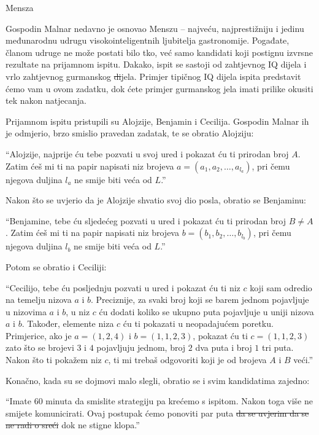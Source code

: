 \begin{statement}[
  problempoints=100,
  timelimit=5 sekundi,
  memorylimit=512 MiB,
]{Mensza}

Gospodin Malnar nedavno je osnovao Menszu -- najveću, najprestižniju i jedinu
međunarodnu udrugu visokointeligentnih ljubitelja gastronomije. Pogađate, članom
udruge ne može postati bilo tko, već samo kandidati koji postignu izvrsne
rezultate na prijamnom ispitu. Dakako, ispit se sastoji od zahtjevnog IQ dijela
i vrlo zahtjevnog gurmanskog \sout{di}jela. Primjer tipičnog IQ dijela ispita
predstavit ćemo vam u ovom zadatku, dok ćete primjer gurmanskog jela imati
prilike okusiti tek nakon natjecanja.

Prijamnom ispitu pristupili su Alojzije, Benjamin i Cecilija. Gospodin Malnar
ih je odmjerio, brzo smislio pravedan zadatak, te se obratio Alojziju:

``Alojzije, najprije ću tebe pozvati u svoj ured i pokazat ću ti prirodan
  broj $A$.  Zatim ćeš mi ti na papir napisati niz brojeva $a = (a_1, a_2,
\ldots, a_{l_a})$, pri čemu njegova duljina $l_a$ ne smije biti veća od $L$.''

Nakon što se uvjerio da je Alojzije shvatio svoj dio posla, obratio se Benjaminu:

``Benjamine, tebe ću sljedećeg pozvati u ured i pokazat ću ti prirodan
  broj $B \ne A$.  Zatim ćeš mi ti na papir napisati niz brojeva $b = (b_1, b_2,
\ldots, b_{l_b})$, pri čemu njegova duljina $l_b$ ne smije biti veća od $L$.''

Potom se obratio i Ceciliji:

``Cecilijo, tebe ću posljednju pozvati u ured i pokazat ću ti niz $c$ koji
sam odredio na temelju nizova $a$ i $b$. Preciznije, za svaki broj koji se barem
jednom pojavljuje u nizovima $a$ i $b$, u niz $c$ ću dodati koliko se ukupno puta
pojavljuje u uniji nizova $a$ i $b$. Također, elemente niza $c$ ću ti pokazati u
neopadajućem poretku. Primjerice, ako je $a = (1, 2, 4)$ i $b = (1, 1, 2, 3)$,
pokazat ću ti $c = (1, 1, 2, 3)$ zato što se brojevi $3$ i $4$ pojavljuju jednom,
broj $2$ dva puta i broj $1$ tri puta. Nakon što ti pokažem niz $c$, ti mi trebaš
odgovoriti koji je od brojeva $A$ i $B$ veći.''

Konačno, kada su se dojmovi malo slegli, obratio se i svim kandidatima zajedno:

``Imate 60 minuta da smislite strategiju pa krećemo s ispitom. Nakon toga
više ne smijete komunicirati. Ovaj postupak ćemo ponoviti par puta
\sout{da se uvjerim da se ne radi o sreći} dok ne stigne klopa.''


\end{statement}
